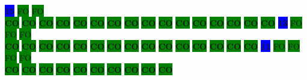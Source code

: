 \colorbox{blue}{\color[rgb]{1,0,0}\textbf{15}}%
\colorbox{green}{\color[gray]{0.75}FO}%
\colorbox{green}{\color[gray]{0.75}FO}%
\\
\colorbox{green}{\color[rgb]{0,0,0}\textbf{CO}}%
\colorbox{green}{\color[rgb]{0,0,0}\textbf{CO}}%
\colorbox{green}{\color[rgb]{0,0,0}\textbf{CO}}%
\colorbox{green}{\color[rgb]{0,0,0}\textbf{CO}}%
\colorbox{green}{\color[rgb]{0,0,0}\textbf{CO}}%
\colorbox{green}{\color[rgb]{0,0,0}\textbf{CO}}%
\colorbox{green}{\color[rgb]{0,0,0}\textbf{CO}}%
\colorbox{green}{\color[rgb]{0,0,0}\textbf{CO}}%
\colorbox{green}{\color[rgb]{0,0,0}\textbf{CO}}%
\colorbox{green}{\color[rgb]{0,0,0}\textbf{CO}}%
\colorbox{green}{\color[rgb]{0,0,0}\textbf{CO}}%
\colorbox{green}{\color[rgb]{0,0,0}\textbf{CO}}%
\colorbox{green}{\color[rgb]{0,0,0}\textbf{CO}}%
\colorbox{green}{\color[rgb]{0,0,0}\textbf{CO}}%
\colorbox{green}{\color[rgb]{0,0,0}\textbf{CO}}%
\colorbox{green}{\color[rgb]{0,0,0}\textbf{CO}}%
\colorbox{blue}{\color[rgb]{1,0,0}\textbf{13}}%
\colorbox{green}{\color[gray]{0.75}FO}%
\colorbox{green}{\color[gray]{0.75}FO}%
\colorbox{green}{\color[gray]{0.75}FO}%
\\
\colorbox{green}{\color[rgb]{0,0,0}\textbf{CO}}%
\colorbox{green}{\color[rgb]{0,0,0}\textbf{CO}}%
\colorbox{green}{\color[rgb]{0,0,0}\textbf{CO}}%
\colorbox{green}{\color[rgb]{0,0,0}\textbf{CO}}%
\colorbox{green}{\color[rgb]{0,0,0}\textbf{CO}}%
\colorbox{green}{\color[rgb]{0,0,0}\textbf{CO}}%
\colorbox{green}{\color[rgb]{0,0,0}\textbf{CO}}%
\colorbox{green}{\color[rgb]{0,0,0}\textbf{CO}}%
\colorbox{green}{\color[rgb]{0,0,0}\textbf{CO}}%
\colorbox{green}{\color[rgb]{0,0,0}\textbf{CO}}%
\colorbox{green}{\color[rgb]{0,0,0}\textbf{CO}}%
\colorbox{green}{\color[rgb]{0,0,0}\textbf{CO}}%
\colorbox{green}{\color[rgb]{0,0,0}\textbf{CO}}%
\colorbox{green}{\color[rgb]{0,0,0}\textbf{CO}}%
\colorbox{green}{\color[rgb]{0,0,0}\textbf{CO}}%
\colorbox{blue}{\color[rgb]{1,0,0}\textbf{11}}%
\colorbox{green}{\color[gray]{0.75}FO}%
\colorbox{green}{\color[gray]{0.75}FO}%
\colorbox{green}{\color[gray]{0.75}FO}%
\colorbox{green}{\color[gray]{0.75}FO}%
\\
\colorbox{green}{\color[rgb]{0,0,0}\textbf{CO}}%
\colorbox{green}{\color[rgb]{0,0,0}\textbf{CO}}%
\colorbox{green}{\color[rgb]{0,0,0}\textbf{CO}}%
\colorbox{green}{\color[rgb]{0,0,0}\textbf{CO}}%
\colorbox{green}{\color[rgb]{0,0,0}\textbf{CO}}%
\colorbox{green}{\color[rgb]{0,0,0}\textbf{CO}}%
\colorbox{green}{\color[rgb]{0,0,0}\textbf{CO}}%
\colorbox{green}{\color[rgb]{0,0,0}\textbf{CO}}%
\colorbox{green}{\color[rgb]{0,0,0}\textbf{CO}}%
\colorbox{green}{\color[rgb]{0,0,0}\textbf{CO}}%
